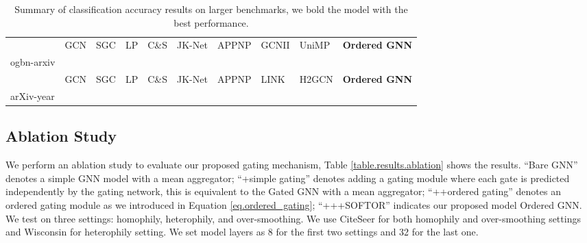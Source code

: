 \documentclass{article}
\begin{document}
\begin{table}
\caption{Summary of classification accuracy results on larger benchmarks, we bold the model with the best performance.}
\label{table.results.larger_benchmark}
\centering
\resizebox{\textwidth}{!}
{
\begin{tabular}{l|ll|ll|ll|ll|l}
\toprule
& GCN & SGC & LP & C\&S & JK-Net & APPNP & GCNII & UniMP & \textbf{Ordered GNN} \\
ogbn-arxiv &  &  &  &  &  &  &  &  &  \\
\midrule
& GCN & SGC & LP & C\&S & JK-Net & APPNP & LINK & H2GCN & \textbf{Ordered GNN} \\
arXiv-year &  &  &  &  &  &  &  &  &  \\
\bottomrule
\end{tabular}
}
\end{table}


\subsection{Ablation Study}

We perform an ablation study to evaluate our proposed gating mechanism, Table \ref{table.results.ablation} shows the results. ``Bare GNN'' denotes a simple GNN model with a mean aggregator; ``+simple gating'' denotes adding a gating module where each gate is predicted independently by the gating network, this is equivalent to the Gated GNN \citep{li2015gated} with a mean aggregator; ``++ordered gating'' denotes an ordered gating module as we introduced in Equation \ref{eq.ordered_gating}; ``+++SOFTOR'' indicates our proposed model Ordered GNN. We test on three settings: homophily, heterophily, and over-smoothing. We use CiteSeer for both homophily and over-smoothing settings and Wisconsin for heterophily setting. We set model layers as 8 for the first two settings and 32 for the last one.


\begin{wraptable}{r}{0.55\textwidth}
\vspace{-0.55cm}
\caption{Ablation study}
\label{table.results.ablation}
\centering
\vspace{0.1cm}
\vspace{-0.25cm}
\end{wraptable}
\end{document}
